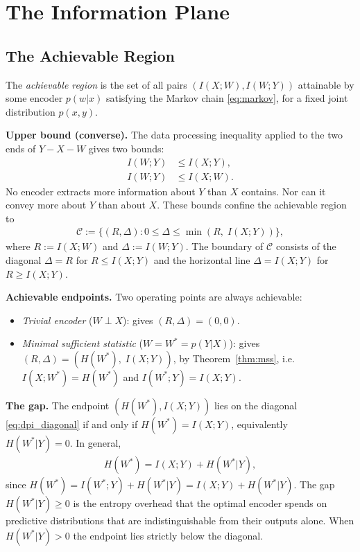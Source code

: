\documentclass[11pt]{article}
\begin{document}

\section{The Information Plane}

\subsection{The Achievable Region}
\label{sec:achievable}

The \textit{achievable region} is the set of all pairs $(I(X;W),I(W;Y))$
attainable by some encoder $p(w|x)$ satisfying the Markov chain
\eqref{eq:markov}, for a fixed joint distribution $p(x,y)$.

\medskip
\noindent\textbf{Upper bound (converse).}
The data processing inequality \cite{cover2006elements} applied to
the two ends of $Y-X-W$ gives two bounds:
\begin{align}
    I(W;Y) &\leq I(X;Y), \label{eq:dpi_horizontal}\\
    I(W;Y) &\leq I(X;W). \label{eq:dpi_diagonal}
\end{align}
No encoder extracts more information about $Y$ than $X$ contains.
Nor can it convey more about $Y$ than about $X$.
These bounds confine the achievable region to
\begin{align}
    \mathcal{C} := \bigl\{(R,\Delta) : 0\leq \Delta \leq \min(R,\;I(X;Y))\bigr\},
    \label{eq:converse}
\end{align}
where $R:=I(X;W)$ and $\Delta:=I(W;Y)$.
The boundary of $\mathcal{C}$ consists of the diagonal
$\Delta=R$ for $R\leq I(X;Y)$ and the horizontal line
$\Delta=I(X;Y)$ for $R\geq I(X;Y)$.

\medskip
\noindent\textbf{Achievable endpoints.}
Two operating points are always achievable:
\begin{itemize}
    \item \textit{Trivial encoder} ($W\perp X$): gives $(R,\Delta)=(0,0)$.
    \item \textit{Minimal sufficient statistic} ($W=W^*=p(Y|X)$): gives $(R,\Delta)=(H(W^*),\;I(X;Y))$,
    by Theorem~\ref{thm:mss}, i.e. $I(X;W^*)=H(W^*)$ and $I(W^*;Y)=I(X;Y)$.
\end{itemize}

\medskip
\noindent\textbf{The gap.}
The endpoint $(H(W^*),I(X;Y))$ lies on the diagonal \eqref{eq:dpi_diagonal}
if and only if $H(W^*)=I(X;Y)$, equivalently $H(W^*|Y)=0$.
In general,
\begin{align}
    H(W^*) = I(X;Y) + H(W^*|Y),
    \label{eq:gap_identity}
\end{align}
since $H(W^*)=I(W^*;Y)+H(W^*|Y)=I(X;Y)+H(W^*|Y)$.
The gap $H(W^*|Y)\geq 0$ is the entropy overhead that the optimal encoder spends on predictive distributions that
are indistinguishable from their outputs alone.
When $H(W^*|Y)>0$ the endpoint lies strictly below the diagonal.
\end{document}
